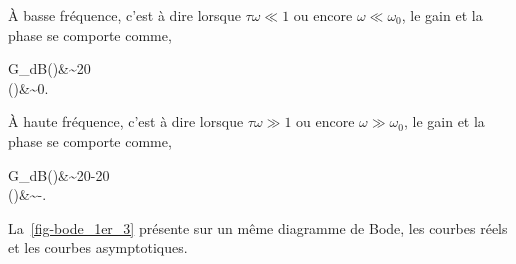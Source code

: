 \`A basse fréquence, c'est à dire lorsque $\tau\omega\ll1$ ou encore $\omega\ll\omega_0$, 
le gain et la phase se comporte comme, 
\begin{bequation}
    G_{dB}(\omega)&\sim20 \\
    \phi(\omega)&\sim0\degree.
\end{bequation} 

\`A haute fréquence, c'est à dire lorsque $\tau\omega\gg1$ ou encore $\omega\gg\omega_0$,
le gain et la phase se comporte comme,
\begin{bequation}
    G_{dB}(\omega)&\sim20-20 \\
    \phi(\omega)&\sim-.
\end{bequation} 
La~\cref{fig-bode_1er_3} présente sur un même diagramme de Bode, les courbes réels et les courbes asymptotiques.


